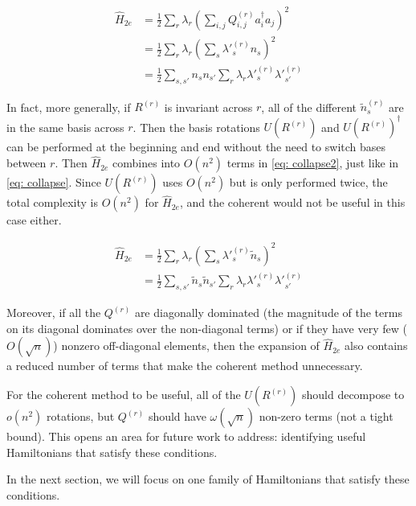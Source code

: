 \begin{equation}
    \begin{split}
        \hat{H}_{2e} &= \frac{1}{2}\sum_r\lambda_r\left(\sum_{i,j} Q^{(r)}_{i, j}a^\dag_ia_j\right)^2 \\
        &= \frac{1}{2}\sum_r\lambda_r(\sum_{s} \lambda'^{(r)}_sn_s)^2 \\
        &= \frac{1}{2}\sum_{s, s'} n_sn_{s'}\sum_r\lambda_r\lambda'^{(r)}_s\lambda'^{(r)}_{s'}
    \end{split}
    \label{eq: collapse}
\end{equation}

In fact, more generally, if $R^{(r)}$ is invariant across $r$, all of the different $\tilde{n}^{(r)}_s$ are in the same basis across $r$. Then the basis rotations $U(R^{(r)})$ and $U(R^{(r)})^\dag$ can be performed at the beginning and end without the need to switch bases between $r$. Then $\hat{H}_{2e}$ combines into $O(n^2)$ terms in \eqref{eq: collapse2}, just like in \eqref{eq: collapse}. Since $U(R^{(r)})$ uses $O(n^2)$ but is only performed twice, the total complexity is $O(n^2)$ for $\hat{H}_{2e}$, and the coherent would not be useful in this case either.

\begin{equation}
    \begin{split}
        \hat{H}_{2e} &= \frac{1}{2}\sum_r\lambda_r\left(\sum_s \lambda'^{(r)}_s \tilde{n}_s\right)^2 \\
        &= \frac{1}{2}\sum_{s, s'} \tilde{n}_s\tilde{n}_{s'}\sum_r\lambda_r\lambda'^{(r)}_s\lambda'^{(r)}_{s'}
    \end{split}
    \label{eq: collapse2}
\end{equation}

Moreover, if all the $Q^{(r)}$ are diagonally dominated (the magnitude of the terms on its diagonal dominates over the non-diagonal terms) or if they have very few ($O(\sqrt{n})$) nonzero off-diagonal elements, then the expansion of $\hat{H}_{2e}$ also contains a reduced number of terms that make the coherent method unnecessary.

For the coherent method to be useful, all of the $U(R^{(r)})$ should decompose to $o(n^2)$ rotations, but $Q^{(r)}$ should have $\omega(\sqrt{n})$ non-zero terms (not a tight bound). This opens an area for future work to address: identifying useful Hamiltonians that satisfy these conditions.

In the next section, we will focus on one family of Hamiltonians that satisfy these conditions.






